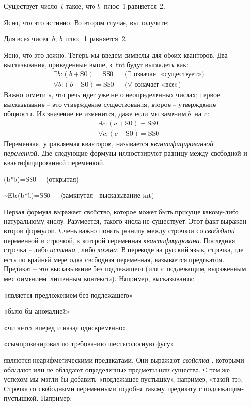 \documentclass[../main.tex]{subfiles}
\begin{document}
Существует число~$b$ такое, что $b$~плюс~1 равняется~2.

Ясно, что это истинно. Во втором случае, вы получите:

Для всех чисел~$b$, $b$~плюс~1 равняется~2.

Ясно, что это ложно. Теперь мы введем символы для обоих кванторов. Два высказывания, приведенные выше, в~\acs{tnt} будут выглядеть как:
\begin{align*}
    & \exists b : (b + \mathrm{S0}) = \mathrm{SS0} && \text{($\exists$ означает «существует»)} \\
    & \forall b : (b + \mathrm{S0}) = \mathrm{SS0} && \text{($\forall$ означает «все»)}
\end{align*}
Важно отметить, что речь идет уже не о неопределенных числах; первое высказывание \--- это утверждение существования, второе \--- утверждение общности. Их значение не изменится, даже если мы заменим $b$~на~$c$:
\begin{align*}
    & \exists c : (c + \mathrm{S0}) = \mathrm{SS0} \\
    & \forall c : (c + \mathrm{S0}) = \mathrm{SS0}
\end{align*}
Переменная, управляемая квантором, называется \emph{квантифицированной переменной}. Две следующие формулы иллюстрируют разницу между свободной и квантифицированной переменной.

(b*b)=SS0~~~(открытая)

\textasciitilde Eb:(b*b)=SS0~~~(замкнутая - высказывание \acs{tnt})

Первая формула выражает свойство, которое может быть присуще какому-либо натуральному числу. Разумеется, такого числа не существует. Этот факт выражен второй формулой. Очень важно понять разницу между строчкой со \emph{свободной} переменной и строчкой, в которой переменная \emph{квантифицирована}. Последняя строчка \--- либо \emph{истинна} , либо \emph{ложна}. В переводе на русский язык, строчка, где есть по крайней мере одна свободная переменная, называется предикатом. Предикат \--- это высказывание без подлежащего (или с подлежащим, выраженным местоимением, лишенным контекста). Например, высказывания:

«является предложением без подлежащего»

«было бы аномалией»

«читается вперед и назад одновременно»

«сымпровизировал по требованию шестиголосную фугу»

являются неарифметическими предикатами. Они выражают \emph{свойства} , которыми обладают или не обладают определенные предметы или существа. С тем же успехом мы могли бы добавить «подлежащее-пустышку», например, «такой-то». Строчка со свободными переменными подобна такому предикату с подлежащим-пустышкой. Например:
\end{document}
